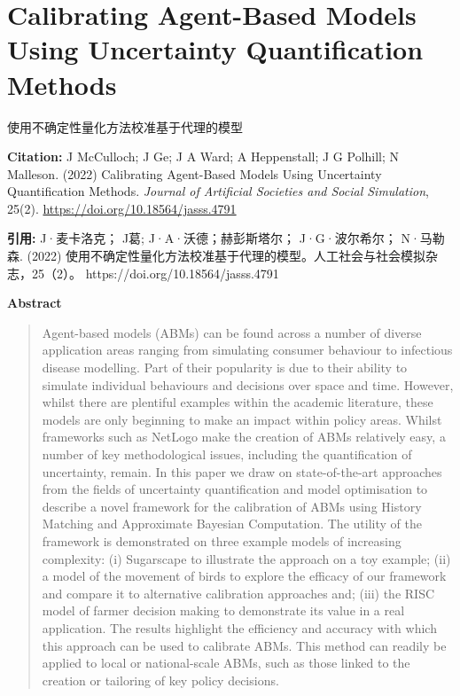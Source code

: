 \vspace{0.5em}


\chapter{Calibrating Agent-Based Models Using Uncertainty Quantification Methods}
\begin{center}\small 使用不确定性量化方法校准基于代理的模型\end{center}

\noindent\textbf{Citation:} J McCulloch; J Ge; J A Ward; A Heppenstall; J G Polhill; N Malleson. (2022) Calibrating Agent-Based Models Using Uncertainty Quantification Methods. \textit{Journal of Artificial Societies and Social Simulation}, 25(2). \url{https://doi.org/10.18564/jasss.4791}

\vspace{0.5em}
\noindent\textbf{引用:} J·麦卡洛克； J葛; J·A·沃德；赫彭斯塔尔； J·G·波尔希尔； N·马勒森. (2022) 使用不确定性量化方法校准基于代理的模型。人工社会与社会模拟杂志，25（2）。 https://doi.org/10.18564/jasss.4791

\vspace{1.5em}
\noindent\textbf{Abstract}\par
\begin{quote}\small
Agent-based models (ABMs) can be found across a number of diverse application areas ranging from simulating consumer behaviour to infectious disease modelling. Part of their popularity is due to their ability to simulate individual behaviours and decisions over space and time. However, whilst there are plentiful examples within the academic literature, these models are only beginning to make an impact within policy areas. Whilst frameworks such as NetLogo make the creation of ABMs relatively easy, a number of key methodological issues, including the quantification of uncertainty, remain. In this paper we draw on state-of-the-art approaches from the fields of uncertainty quantification and model optimisation to describe a novel framework for the calibration of ABMs using History Matching and Approximate Bayesian Computation. The utility of the framework is demonstrated on three example models of increasing complexity: (i) Sugarscape to illustrate the approach on a toy example; (ii) a model of the movement of birds to explore the efficacy of our framework and compare it to alternative calibration approaches and; (iii) the RISC model of farmer decision making to demonstrate its value in a real application. The results highlight the efficiency and accuracy with which this approach can be used to calibrate ABMs. This method can readily be applied to local or national-scale ABMs, such as those linked to the creation or tailoring of key policy decisions.
\end{quote}

